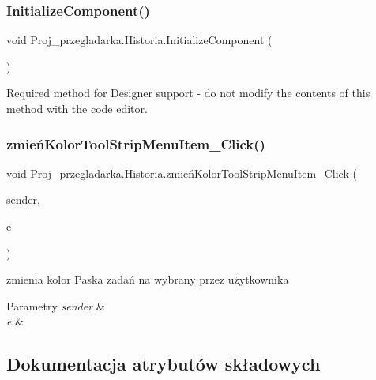 \subsubsection{\texorpdfstring{InitializeComponent()}{InitializeComponent()}}
{\footnotesize\ttfamily void Proj\+\_\+przegladarka.\+Historia.\+Initialize\+Component (\begin{DoxyParamCaption}{ }\end{DoxyParamCaption})\hspace{0.3cm}{\ttfamily [private]}}



Required method for Designer support -\/ do not modify the contents of this method with the code editor. 

\mbox{\label{class_proj__przegladarka_1_1_historia_aa4cb68239bbc0a1a2017ef979df8b803}} 
\subsubsection{\texorpdfstring{zmieńKolorToolStripMenuItem\_Click()}{zmieńKolorToolStripMenuItem\_Click()}}
{\footnotesize\ttfamily void Proj\+\_\+przegladarka.\+Historia.\+zmień\+Kolor\+Tool\+Strip\+Menu\+Item\+\_\+\+Click (\begin{DoxyParamCaption}\item[{object}]{sender,  }\item[{Event\+Args}]{e }\end{DoxyParamCaption})\hspace{0.3cm}{\ttfamily [private]}}



zmienia kolor Paska zadań na wybrany przez użytkownika 


\begin{DoxyParams}{Parametry}
{\em sender} & \\
\hline
{\em e} & \\
\hline
\end{DoxyParams}


\subsection{Dokumentacja atrybutów składowych}
\mbox{\label{class_proj__przegladarka_1_1_historia_a1ac23c4e73ab59069446cdb8eefdfec2}} 
